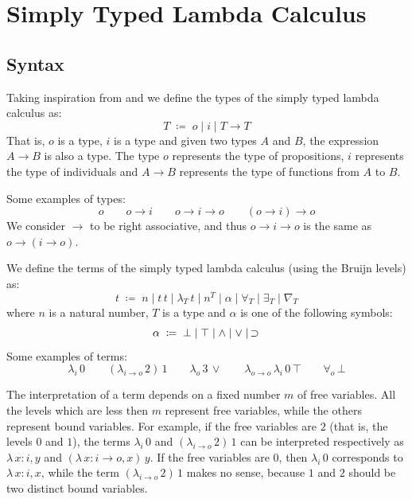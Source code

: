 \documentclass[a4paper]{article}
\theoremstyle{definition}
\newcommand*{\ifempty}[3]{\ifthenelse{\equal{#1}{}}{#2}{#3}}
\newcommand*{\lvln}{n}
\newcommand*{\inddef}[2]{#1 \; \coloneq \; #2}
\newcommand*{\tyarr}[2]{#1 \rightarrow #2}
\newcommand*{\typrp}{o}
\newcommand*{\tyind}{i}
\newcommand*{\tpquant}[2]{#1_{#2}}
\newcommand*{\tmapp}[2]{#1 \, #2}
\newcommand*{\tmabs}[2]{\tpquant{\lambda}{#1} \, #2}
\newcommand*{\tmnom}[2]{#2^{#1}}
\newcommand*{\tmimp}[2]{\ifempty{#1}{\,}{#1} \supset \ifempty{#2}{\,}{#2}}
\newcommand*{\tmfors}[1]{\tpquant{\forall}{#1}}
\newcommand*{\tmexs}[1]{\tpquant{\exists}{#1}}
\newcommand*{\tmnabs}[1]{\tpquant{\nabla}{#1}}
\begin{document}
\section{Simply Typed Lambda Calculus}


\subsection{Syntax}

Taking inspiration from \cite{church:types} and \cite{pierce:plf} we define the types of the simply typed lambda calculus as:
\[
    \inddef{T}{\typrp \mid \tyind \mid \tyarr{T}{T}}
\]
That is, $\typrp$ is a type, $\tyind$ is a type and given two types $A$ and $B$, the expression $A \rightarrow B$ is also a type.
The type $\typrp$ represents the type of propositions, $\tyind$ represents the type of individuals and $A \rightarrow B$ represents the type of functions from $A$ to $B$.

Some examples of types:
\[
    \typrp \qquad
    \tyarr{\typrp}{\tyind} \qquad
    \tyarr{\typrp}{\tyarr{\tyind}{\typrp}} \qquad
    \tyarr{(\tyarr{\typrp}{\tyind})}{\typrp}
\]
We consider $\tyarr{}{}$ to be right associative, and thus $\tyarr{\typrp}{\tyarr{\tyind}{\typrp}}$ is the same as $\tyarr{\typrp}{(\tyarr{\tyind}{\typrp})}$.

We define the terms of the simply typed lambda calculus (using the Bruijn levels) as:
\[
    \inddef{t}{\lvln \mid \tmapp{t}{t} \mid \tmabs{T}{t} \mid \tmnom{T}{n} \mid \alpha \mid \tmfors{T} \mid \tmexs{T} \mid \tmnabs{T}}
\]
where $\lvln$ is a natural number, $T$ is a type and $\alpha$ is one of the following symbols:
\[
    \inddef{\alpha}{\bot \mid \top \mid \land \mid \lor \mid \tmimp{}{}}
\]
Some examples of terms:
\[
    \tmabs{\tyind}{0} \qquad
    \tmapp{(\tmabs{\tyarr{\tyind}{\typrp}}{2})}{1} \qquad
    \tmabs{\typrp}{\tmapp{3}{\lor}} \qquad
    \tmabs{\tyarr{\typrp}{\typrp}}{\tmabs{\tyind}{\tmapp{0}{\top}}} \qquad
    \tmapp{\tmfors{o}}{\bot}
\]

The interpretation of a term depends on a fixed number $m$ of free variables.
All the levels which are less then $m$ represent free variables, while the others represent bound variables.
For example, if the free variables are $2$ (that is, the levels $0$ and $1$), the terms $\tmabs{\tyind}{0}$ and $\tmapp{(\tmabs{\tyarr{\tyind}{\typrp}}{2})}{1}$ can be interpreted respectively as $\lambda \, x \colon \tyind, y$ and $\tmapp{(\lambda \, x \colon \tyarr{\tyind}{\typrp}, x)}{y}$.
If the free variables are $0$, then $\tmabs{\tyind}{0}$ corresponds to $\lambda \, x \colon \tyind, x$, while the term $\tmapp{(\tmabs{\tyarr{\tyind}{\typrp}}{2})}{1}$ makes no sense, because $1$ and $2$ should be two distinct bound variables.
\end{document}
